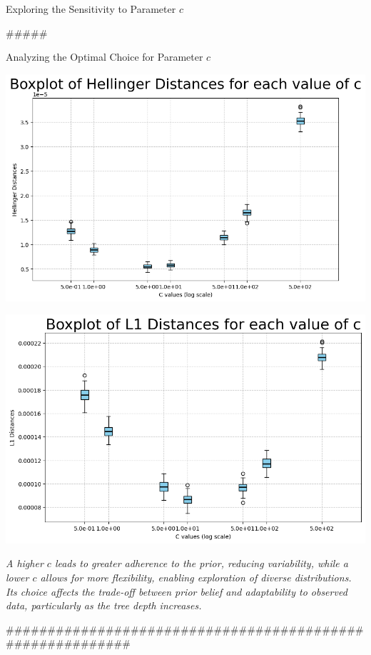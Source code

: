 \documentclass{beamer}
\begin{document}
\begin{frame}{Exploring the Sensitivity to Parameter \(c\)}
\begin{figure}
\begin{minipage}{0.32\textwidth}
        \end{minipage}
    \end{figure}
    \caption{\(Beta(2,2)\)}
\end{frame}

#####

\begin{frame}{Analyzing the Optimal Choice for Parameter \(c\)}
    \centering
    \begin{minipage}{0.45\textwidth}
        \centering
        \includegraphics[width=\textwidth]{sorriso.jpeg}
    \end{minipage}
    \hfill
    \begin{minipage}{0.45\textwidth}
        \centering
        \includegraphics[width=\textwidth]{sorriso2.jpg}
    \end{minipage}
    
    \bigskip
    \bigskip
    \textit{A higher \(c\) leads to greater adherence to the prior, reducing variability, while a lower \(c\) allows for more flexibility, enabling exploration of diverse distributions. Its choice affects the trade-off between prior belief and adaptability to observed data, particularly as the tree depth increases.}
\end{frame}##########################################################
\end{document}
